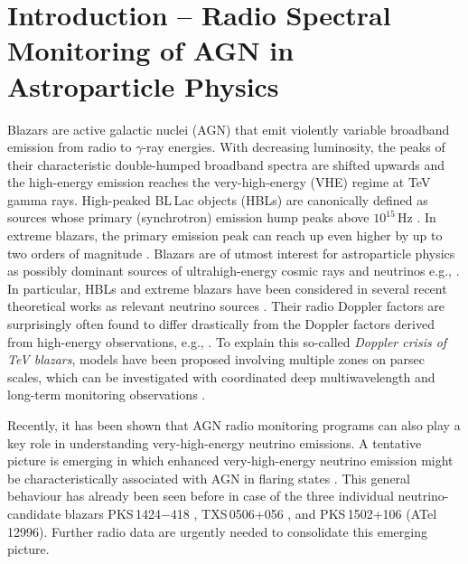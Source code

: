 \documentclass[a4paper,11pt]{article}
\begin{document}
\section{Introduction -- Radio Spectral Monitoring of AGN in Astroparticle Physics}
\noindent
Blazars are active galactic nuclei (AGN) that emit violently variable broadband emission from radio to $\gamma$-ray energies. 
With decreasing luminosity, the peaks of their characteristic double-humped broadband spectra are shifted upwards and the high-energy emission reaches the very-high-energy (VHE) regime at TeV gamma rays.
High-peaked BL\,Lac objects (HBLs) are canonically defined as sources whose primary (synchrotron) emission hump peaks above $10^{15}$\,Hz \cite{Padovani1995}. In extreme blazars, the primary emission peak can reach up even higher by up to two orders of magnitude \cite{Ghisellini1999,Biteau2020}. 
{Blazars are of utmost interest for astroparticle physics as possibly dominant sources of ultrahigh-energy cosmic rays and neutrinos} e.g., \cite{Hillas1984,Mannheim1995}. In particular, HBLs and extreme blazars have been considered in several recent theoretical works as relevant neutrino sources \cite{TavecchioGhiselliniGuetta2014,Padovani2015,Giommi2020}. 
Their radio Doppler factors are surprisingly often found to differ drastically from the Doppler factors derived from high-energy observations, e.g., \cite{PinerEdwards2018}. To explain this so-called \textsl{Doppler crisis of TeV blazars}, models have been proposed involving multiple zones on parsec scales, which can be investigated with coordinated deep multiwavelength and long-term monitoring observations \cite[e.g.,][]{Hervet2019}. 

Recently, it has been shown that {AGN radio monitoring programs can also play a key role in understanding very-high-energy neutrino emissions}. A tentative picture is emerging in which enhanced very-high-energy neutrino emission might be characteristically associated with AGN in flaring states \cite{Plavin2020,Hovatta2021}. This general behaviour has already been seen before in case of the three individual neutrino-candidate blazars PKS\,1424$-$418 \cite{Kadler2016}, TXS\,0506+056 \cite{kun2019}, and PKS\,1502+106 (ATel\,12996). 
Further radio data are urgently needed to consolidate this emerging picture. 
\end{document}
